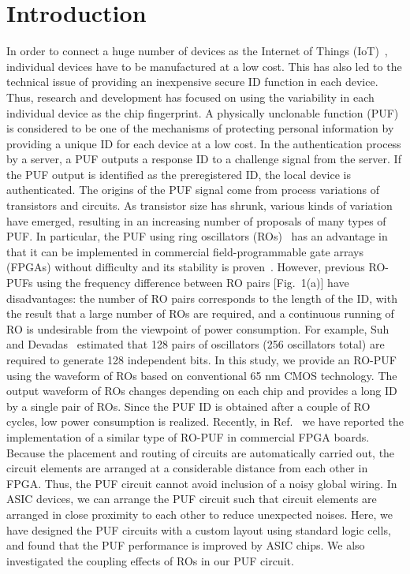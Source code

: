 \documentclass[%
reprint, amsmath,amssymb,%
pra,
]{revtex4-1}
\begin{document}
\section{Introduction}
   In order to connect a huge number of devices as the Internet of Things (IoT)~\cite{IoT}, 
individual devices have to be manufactured at a low cost. 
This has also led to the technical issue of providing an inexpensive secure ID function 
in each device. Thus, research and development has focused on 
using the variability in each individual device as the chip fingerprint. 
A physically unclonable function (PUF) is considered to be one of the mechanisms 
of protecting personal information by providing a unique ID for each device at a low cost.
In the authentication process by a server, a PUF outputs a response ID to a challenge signal from the server.
If the PUF output is identified as the preregistered ID, the local device is authenticated.  
The origins of the PUF signal come from process variations of transistors and circuits. 
As transistor size has shrunk, various kinds of variation have emerged, 
resulting in an increasing number of proposals of many types of PUF\cite{arbiter,Lee,Guajardo,Holcomb,Kim,Marukame,Takaya,Takaya1,RRAM,Xie,Chen,Suh,Maiti0,Maiti1,Merli,Habib,Yin,Fischer,butterfly,FF-PUF,Yamamoto}. 
In particular, the PUF using ring oscillators (ROs)~\cite{Suh} has an advantage in that it can be implemented in commercial 
field-programmable gate arrays (FPGAs) without difficulty and its stability is proven~\cite{Maiti0,Merli,Yin}. 
However, previous RO-PUFs using the frequency difference between RO pairs [Fig.~1(a)] 
have disadvantages: the number of RO pairs corresponds to the length of the ID, 
with the result that a large number of ROs are required, and a continuous running of RO is undesirable 
from the viewpoint of power consumption. 
For example, Suh and Devadas~\cite{Suh} estimated that
128 pairs of oscillators (256 oscillators total) are required to generate 128 independent bits.
   In this study, we provide an RO-PUF using the waveform of ROs based on conventional 65 nm CMOS technology. The output waveform of ROs changes depending on each chip and provides
a long ID by a single pair of ROs.
Since the PUF ID is obtained after a couple of RO cycles, 
low power consumption is realized. 
Recently, in Ref.~\cite{tanaCASII} we have reported the implementation of a similar type of RO-PUF in commercial FPGA boards.
Because the placement and routing of circuits are automatically carried out, 
the circuit elements are arranged at a considerable distance from each other in FPGA. 
Thus, the PUF circuit cannot avoid inclusion of a noisy global wiring.
In ASIC devices, we can arrange the PUF circuit 
such that circuit elements are arranged in close proximity to each other 
to reduce unexpected noises. 
Here, we have designed the PUF circuits with a custom layout using standard logic cells, 
and found that the PUF performance is improved by ASIC chips. 
We also investigated the coupling effects of ROs in our PUF circuit.
\end{document}
